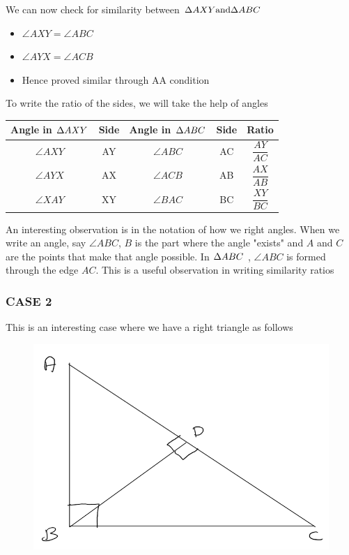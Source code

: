 We can now check for similarity between $\Delta {AXY} \text{and} \Delta {ABC}$
\begin{itemize}
    \item $\angle{AXY} = \angle{ABC}$
    \item $\angle{AYX} = \angle{ACB}$
    \item Hence proved similar through AA condition
\end{itemize}

To write the ratio of the sides, we will take the help of angles
\begin{table}[h!]
    \centering
    \begin{tabular}{|| c | c | c | c | c ||}
        \hline
         Angle in $\Delta {AXY}$ & Side & Angle in $\Delta {ABC}$ & Side & Ratio  \\
        \hline
         $\angle{AXY}$ & AY & $\angle{ABC}$ & AC & $\dfrac{AY}{AC}$ \\ 
         \hline
         $\angle{AYX}$ & AX & $\angle{ACB}$ & AB & $\dfrac{AX}{AB}$ \\ 
         \hline
         $\angle{XAY}$ & XY & $\angle{BAC}$ & BC & $\dfrac{XY}{BC}$ \\ 
         \hline
    \end{tabular}
\end{table}

\begin{NOTE}
    An interesting observation is in the notation of how we right angles. When we write an angle, say $\angle{ABC}$, $B$ is the part where the angle "exists" and $A$ and $C$ are the points that make that angle possible. In $\Delta {ABC}$ , $\angle{ABC}$ is formed through the edge $AC$. This is a useful observation in writing similarity ratios
\end{NOTE}

\subsubsection{CASE 2}

This is an interesting case where we have a right triangle as follows

\begin{figure}[h!]
    \centering
    \includegraphics[width=0.5\linewidth]{Quant//Geometry//Images//Triangles/rodha_triangle_6_similarity_equation_case_2.png}
\end{figure}

